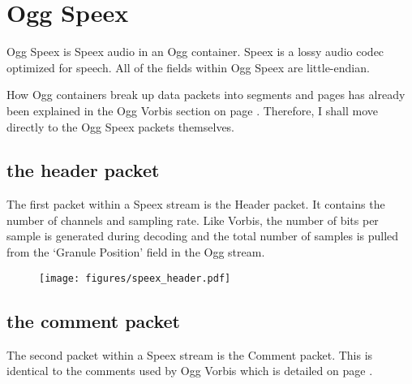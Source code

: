 
\chapter{Ogg Speex}
Ogg Speex is Speex audio in an Ogg container.
Speex is a lossy audio codec optimized for speech.
All of the fields within Ogg Speex are little-endian.

How Ogg containers break up data packets into segments and pages
has already been explained in the Ogg Vorbis section on page \pageref{vorbis}.
Therefore, I shall move directly to the Ogg Speex packets themselves.

\section{the header packet}

The first packet within a Speex stream is the Header packet.
It contains the number of channels and sampling rate.
Like Vorbis, the number of bits per sample is generated during
decoding and the total number of samples is pulled from the
`Granule Position' field in the Ogg stream.

\begin{figure}[h]
\texttt{[image: figures/speex\_header.pdf]}
\end{figure}

\section{the comment packet}

The second packet within a Speex stream is the Comment packet.
This is identical to the comments used by Ogg Vorbis which is
detailed on page \pageref{vorbiscomment}.
